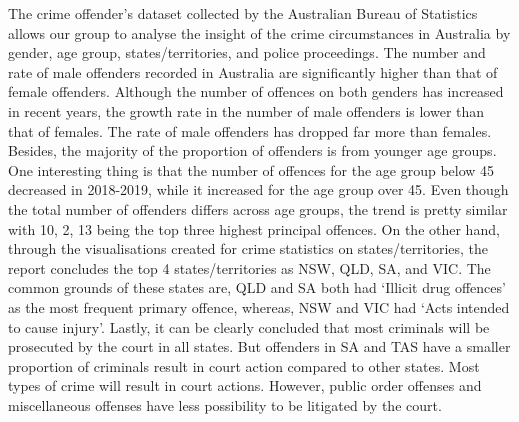 \documentclass[11pt,a4paper,]{article}
\begin{document}
The crime offender's dataset collected by the Australian Bureau of Statistics allows our group to analyse the insight of the crime circumstances in Australia by gender, age group, states/territories, and police proceedings. The number and rate of male offenders recorded in Australia are significantly higher than that of female offenders. Although the number of offences on both genders has increased in recent years, the growth rate in the number of male offenders is lower than that of females. The rate of male offenders has dropped far more than females. Besides, the majority of the proportion of offenders is from younger age groups. One interesting thing is that the number of offences for the age group below 45 decreased in 2018-2019, while it increased for the age group over 45. Even though the total number of offenders differs across age groups, the trend is pretty similar with 10, 2, 13 being the top three highest principal offences. On the other hand, through the visualisations created for crime statistics on states/territories, the report concludes the top 4 states/territories as NSW, QLD, SA, and VIC. The common grounds of these states are, QLD and SA both had `Illicit drug offences' as the most frequent primary offence, whereas, NSW and VIC had `Acts intended to cause injury'. Lastly, it can be clearly concluded that most criminals will be prosecuted by the court in all states. But offenders in SA and TAS have a smaller proportion of criminals result in court action compared to other states. Most types of crime will result in court actions. However, public order offenses and miscellaneous offenses have less possibility to be litigated by the court.

\printbibliography[title=Reference]
\end{document}
